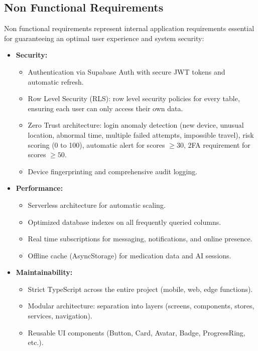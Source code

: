 \documentclass[12pt,a4paper,oneside]{report}
\begin{document}
\subsection{Non Functional Requirements}

Non functional requirements represent internal application requirements essential for guaranteeing an optimal user experience and system security:

\begingroup
\renewcommand{\labelitemii}{\textbullet}
\begin{itemize}
    \item \textbf{Security:}
    \begin{itemize}
        \item Authentication via Supabase Auth with secure JWT tokens and automatic refresh.
        \item Row Level Security (RLS): row level security policies for every table, ensuring each user can only access their own data.
        \item Zero Trust architecture: login anomaly detection (new device, unusual location, abnormal time, multiple failed attempts, impossible travel), risk scoring (0 to 100), automatic alert for scores $\geq 30$, 2FA requirement for scores $\geq 50$.
        \item Device fingerprinting and comprehensive audit logging.
    \end{itemize}
    \item \textbf{Performance:}
    \begin{itemize}
        \item Serverless architecture for automatic scaling.
        \item Optimized database indexes on all frequently queried columns.
        \item Real time subscriptions for messaging, notifications, and online presence.
        \item Offline cache (AsyncStorage) for medication data and AI sessions.
    \end{itemize}
    \item \textbf{Maintainability:}
    \begin{itemize}
        \item Strict TypeScript across the entire project (mobile, web, edge functions).
        \item Modular architecture: separation into layers (screens, components, stores, services, navigation).
        \item Reusable UI components (Button, Card, Avatar, Badge, ProgressRing, etc.).

\end{itemize}
\end{itemize}
\end{document}
